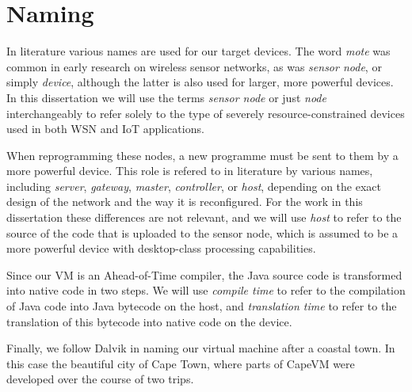 \section{Naming}
In literature various names are used for our target devices. The word \emph{mote} was common in early research on wireless sensor networks, as was \emph{sensor node}, or simply \emph{device}, although the latter is also used for larger, more powerful devices. In this dissertation we will use the terms \emph{sensor node} or just \emph{node} interchangeably to refer solely to the type of severely resource-constrained devices used in both WSN and IoT applications.


When reprogramming these nodes, a new programme must be sent to them by a more powerful device. This role is refered to in literature by various names, including \emph{server}, \emph{gateway}, \emph{master}, \emph{controller}, or \emph{host}, depending on the exact design of the network and the way it is reconfigured. For the work in this dissertation these differences are not relevant, and we will use \emph{host} to refer to the source of the code that is uploaded to the sensor node, which is assumed to be a more powerful device with desktop-class processing capabilities.

Since our VM is an Ahead-of-Time compiler, the Java source code is transformed into native code in two steps. We will use \emph{compile time} to refer to the compilation of Java code into Java bytecode on the host, and \emph{translation time} to refer to the translation of this bytecode into native code on the device.

Finally, we follow Dalvik in naming our virtual machine after a coastal town. In this case the beautiful city of Cape Town, where parts of CapeVM were developed over the course of two trips.

